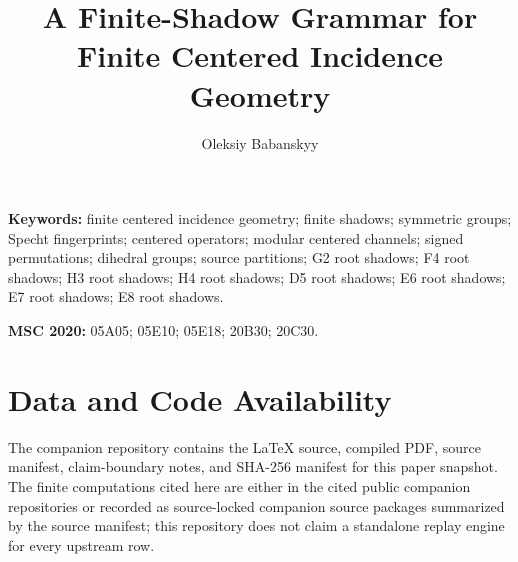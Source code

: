 \documentclass[11pt,a4paper]{article}
\title{A Finite-Shadow Grammar for Finite Centered Incidence Geometry}
\author{Oleksiy Babanskyy}
\date{}
\begin{document}
\pagestyle{plain}
\maketitle

\begin{abstract}

\end{abstract}

\smallskip
\noindent\textbf{Keywords:} finite centered incidence geometry; finite shadows; symmetric groups; Specht fingerprints; centered operators; modular centered channels; signed permutations; dihedral groups; source partitions; G2 root shadows; F4 root shadows; H3 root shadows; H4 root shadows; D5 root shadows; E6 root shadows; E7 root shadows; E8 root shadows.

\smallskip
\noindent\textbf{MSC 2020:} 05A05; 05E10; 05E18; 20B30; 20C30.




















\appendix

\FloatBarrier


\section*{Data and Code Availability}
The companion repository contains the LaTeX source, compiled PDF, source manifest, claim-boundary notes, and SHA-256 manifest for this paper snapshot.  The finite computations cited here are either in the cited public companion repositories or recorded as source-locked companion source packages summarized by the source manifest; this repository does not claim a standalone replay engine for every upstream row.



\end{document}
